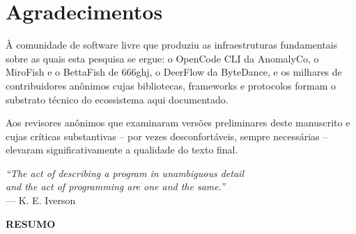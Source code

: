 \documentclass[12pt,a4paper,sumario=tradicional,openany]{abntex2}
\begin{document}
\imprimircapa
\imprimirfolhaderosto

\newpage
\thispagestyle{empty}
\vspace*{10cm}
\begin{center}
\end{center}

\newpage
\chapter*{Agradecimentos}

À comunidade de software livre que produziu as infraestruturas fundamentais sobre as quais esta pesquisa se ergue: o OpenCode CLI da AnomalyCo, o MiroFish e o BettaFish de 666ghj, o DeerFlow da ByteDance, e os milhares de contribuidores anônimos cujas bibliotecas, frameworks e protocolos formam o substrato técnico do ecossistema aqui documentado.

Aos revisores anônimos que examinaram versões preliminares deste manuscrito e cujas críticas substantivas -- por vezes desconfortáveis, sempre necessárias -- elevaram significativamente a qualidade do texto final.

\newpage
\thispagestyle{empty}
\vspace*{8cm}
\begin{flushright}
\textit{``The act of describing a program in unambiguous detail}\\
\textit{and the act of programming are one and the same.''}\\[0.5cm]
--- K. E. Iverson
\end{flushright}

\newpage
\begin{center}\textbf{RESUMO}\end{center}
\end{document}
